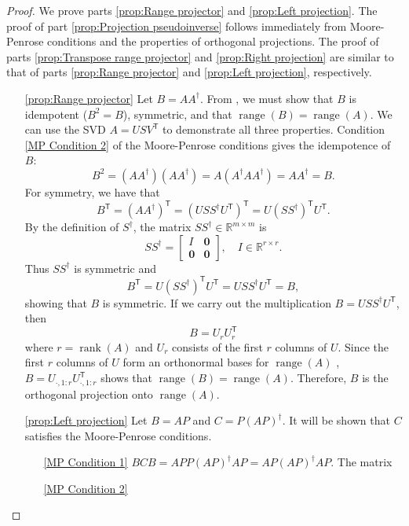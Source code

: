 \documentclass[12pt]{article}
\newcommand{\trans}[1]{{#1}^\mathsf{T}}	%
\newcommand{\pinv}[1]{{#1}^\dagger}	%
\DeclareMathOperator{\rank}{rank}	%
\DeclareMathOperator{\range}{range}	%
\newcommand{\zeroVec}{\bm{0}}	%
\begin{document}
\begin{proof}
We prove parts \ref{prop:Range projector} and \ref{prop:Left projection}. The proof of part \ref{prop:Projection pseudoinverse} follows immediately from Moore-Penrose conditions and the properties of orthogonal projections. The proof of parts \ref{prop:Transpose range projector} and \ref{prop:Right projection} are similar to that of parts \ref{prop:Range projector} and \ref{prop:Left projection}, respectively. 
\begin{enumerate}
    \item[\ref{prop:Range projector}] Let $B = A\pinv{A}$.  From \cite[p.~82]{GolubVanLoan2013}, we must show that $B$ is idempotent ($B^2 = B$), symmetric, and that $\range(B) = \range(A)$. We can use the SVD $A = US\trans{V}$ to demonstrate all three properties. Condition \ref{MP Condition 2} of the Moore-Penrose conditions gives the idempotence of $B$:
    \[B^2 = \left(A\pinv{A}\right)\left(A\pinv{A}\right) = A\left(\pinv{A}A\pinv{A}\right) = A\pinv{A} = B.\]
    For symmetry, we have that
    \[\trans{B} = \trans{\left(A\pinv{A}\right)} = \trans{\left(US\pinv{S}\trans{U}\right)} = U\trans{\left(S\pinv{S}\right)}\trans{U}.\]
    By the definition of $\pinv{S}$, the matrix $S\pinv{S} \in \mathbb{R}^{m \times m}$ is
    \[S\pinv{S} = \begin{bmatrix}
    I & \zeroVec \\
    \zeroVec & \zeroVec
    \end{bmatrix}, \quad I \in \mathbb{R}^{r \times r}.\]
    Thus $S\pinv{S}$ is symmetric and 
    \[\trans{B} = U\trans{\left(S\pinv{S}\right)}\trans{U} = US\pinv{S}\trans{U} = B,\]
    showing that $B$ is symmetric. If we carry out the multiplication $B = US\pinv{S}\trans{U}$, then
    \[B = U_{r}\trans{U}_{r}\]
    where $r = \rank(A)$ and $U_r$ consists of the first $r$ columns of $U$. Since the first $r$ columns of $U$ form an orthonormal bases for $\range(A)$ \cite[p.~340]{Leon2010}, $B = U_{\cdot,1:r}\trans{U}_{\cdot,1:r}$ shows that $\range(B) = \range(A)$. Therefore, $B$ is the orthogonal projection onto $\range(A)$.
    \item[\ref{prop:Left projection}] Let $B = AP$ and $C = P\pinv{\left(AP\right)}$. It will be shown that $C$ satisfies the Moore-Penrose conditions.
    \begin{enumerate}
        \item[\ref{MP Condition 1}] $BCB = APP\pinv{\left(AP\right)}AP = AP\pinv{\left(AP\right)}AP$. The matrix 
        \item[\ref{MP Condition 2}]  

\end{enumerate}
\end{enumerate}
\end{proof}
\end{document}
